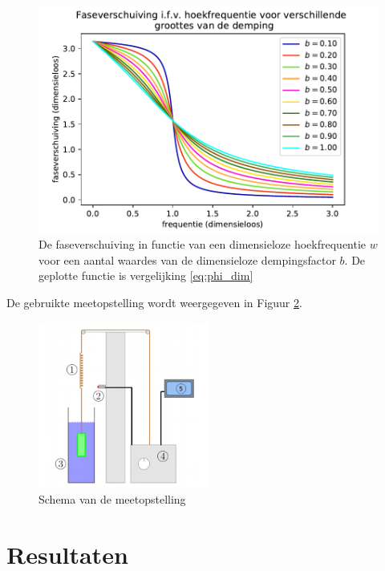 \documentclass[a4paper]{article}
\begin{document}
\begin{figure}
    \centering
    \includegraphics[width=0.8\linewidth]{dimensieloze_faseverschuiving.pdf}
    \caption{De faseverschuiving in functie van een dimensieloze hoekfrequentie $w$ voor een aantal waardes van de dimensieloze dempingsfactor $b$. De geplotte functie is vergelijking \ref{eq:phi_dim}}
    \label{fig:my_label}
\end{figure}



De gebruikte meetopstelling wordt weergegeven in Figuur \ref{fig: meetopstelling}. 

\begin{figure}[H]
  \centering
    \includegraphics[width=0.5\textwidth]{Capture}
    \caption{Schema van de meetopstelling}
  \label{fig: meetopstelling}
\end{figure}


\section{Resultaten}
\end{document}
